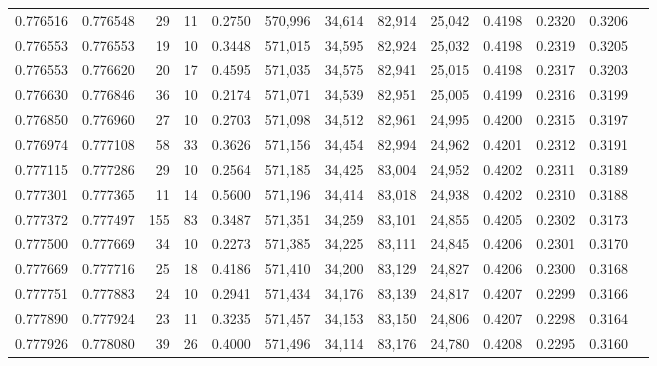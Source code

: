 \begin{tabular}{rrrrrrrrrrrrr}
0.776516 & 0.776548 &    29 &  11 &                                     0.2750 & 570,996 &  34,614 &  82,914 &  25,042 & 0.4198 & 0.2320 & 0.3206 \\
0.776553 & 0.776553 &    19 &  10 &                                     0.3448 & 571,015 &  34,595 &  82,924 &  25,032 & 0.4198 & 0.2319 & 0.3205 \\
0.776553 & 0.776620 &    20 &  17 &                                     0.4595 & 571,035 &  34,575 &  82,941 &  25,015 & 0.4198 & 0.2317 & 0.3203 \\
0.776630 & 0.776846 &    36 &  10 &                                     0.2174 & 571,071 &  34,539 &  82,951 &  25,005 & 0.4199 & 0.2316 & 0.3199 \\
0.776850 & 0.776960 &    27 &  10 &                                     0.2703 & 571,098 &  34,512 &  82,961 &  24,995 & 0.4200 & 0.2315 & 0.3197 \\
0.776974 & 0.777108 &    58 &  33 &                                     0.3626 & 571,156 &  34,454 &  82,994 &  24,962 & 0.4201 & 0.2312 & 0.3191 \\
0.777115 & 0.777286 &    29 &  10 &                                     0.2564 & 571,185 &  34,425 &  83,004 &  24,952 & 0.4202 & 0.2311 & 0.3189 \\
0.777301 & 0.777365 &    11 &  14 &                                     0.5600 & 571,196 &  34,414 &  83,018 &  24,938 & 0.4202 & 0.2310 & 0.3188 \\
0.777372 & 0.777497 &   155 &  83 &                                     0.3487 & 571,351 &  34,259 &  83,101 &  24,855 & 0.4205 & 0.2302 & 0.3173 \\
0.777500 & 0.777669 &    34 &  10 &                                     0.2273 & 571,385 &  34,225 &  83,111 &  24,845 & 0.4206 & 0.2301 & 0.3170 \\
0.777669 & 0.777716 &    25 &  18 &                                     0.4186 & 571,410 &  34,200 &  83,129 &  24,827 & 0.4206 & 0.2300 & 0.3168 \\
0.777751 & 0.777883 &    24 &  10 &                                     0.2941 & 571,434 &  34,176 &  83,139 &  24,817 & 0.4207 & 0.2299 & 0.3166 \\
0.777890 & 0.777924 &    23 &  11 &                                     0.3235 & 571,457 &  34,153 &  83,150 &  24,806 & 0.4207 & 0.2298 & 0.3164 \\
0.777926 & 0.778080 &    39 &  26 &                                     0.4000 & 571,496 &  34,114 &  83,176 &  24,780 & 0.4208 & 0.2295 & 0.3160 \\

\end{tabular}

